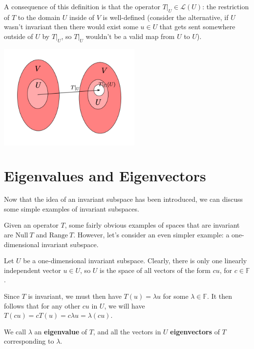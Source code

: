 \documentclass[10pt, oneside]{article}
\begin{document}
      A consequence of this definition is that the operator $T |_{U} \in \mathcal{L}(U)$: the restriction
      of $T$ to the domain $U$ inside of $V$ is well-defined (consider the alternative, if $U$ wasn't invariant then
      there would exist some $u \in U$ that gets
      sent somewhere outside of $U$ by $T|_U$, so $T|_U$ wouldn't be a valid map from $U$ to $U$).

      \begin{center}
        \includegraphics[width=200pt]{assets/invar.png}
      \end{center}

      \section{Eigenvalues and Eigenvectors}

      Now that the idea of an invariant subspace has been introduced, we can discuss some simple examples
      of invariant subspaces.
      \newline

      Given an operator $T$, some fairly obvious examples of spaces that are invariant are $\text{Null} \ T$ and
      $\text{Range} \ T$. However, let's consider an even simpler example: a one-dimensional invariant subspace.
      \newline

      Let $U$ be a one-dimensional invariant subspace. Clearly, there is only one linearly independent
      vector $u \in U$, so $U$ is the space of all vectors of the form $c u$, for $c \in \mathbb{F}$.
      \newline

      Since $T$ is invariant, we must then have $T(u) = \lambda u$ for some $\lambda \in \mathbb{F}$.
      It then follows that for any other $cu$
      in $U$, we will have $T(cu) = cT(u) = c\lambda u = \lambda(cu)$.
      \newline

      We call $\lambda$ an \textbf{eigenvalue} of $T$, and all the vectors in $U$ \textbf{eigenvectors} of $T$
      corresponding to $\lambda$.
      \newline
\end{document}
